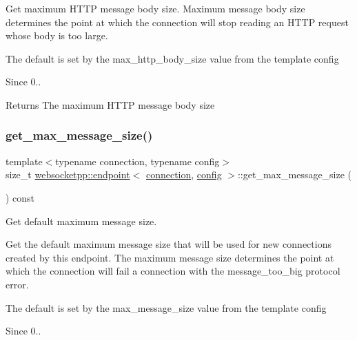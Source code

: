 Get maximum H\+T\+TP message body size. Maximum message body size determines the point at which the connection will stop reading an H\+T\+TP request whose body is too large.

The default is set by the max\+\_\+http\+\_\+body\+\_\+size value from the template config

\begin{DoxySince}{Since}
0..
\end{DoxySince}
\begin{DoxyReturn}{Returns}
The maximum H\+T\+TP message body size 
\end{DoxyReturn}
\mbox{\label{classwebsocketpp_1_1endpoint_a67d0a1ac6e9a332a485f569e71f85882}} 
\subsubsection{\texorpdfstring{get\+\_\+max\+\_\+message\+\_\+size()}{get\_max\_message\_size()}}
{\footnotesize\ttfamily template$<$typename connection, typename config$>$ \\
size\+\_\+t \mbox{\hyperlink{classwebsocketpp_1_1endpoint}{websocketpp\+::endpoint}}$<$ \mbox{\hyperlink{classwebsocketpp_1_1connection}{connection}}, \mbox{\hyperlink{classconfig}{config}} $>$\+::get\+\_\+max\+\_\+message\+\_\+size (\begin{DoxyParamCaption}{ }\end{DoxyParamCaption}) const\hspace{0.3cm}{\ttfamily [inline]}}



Get default maximum message size. 

Get the default maximum message size that will be used for new connections created by this endpoint. The maximum message size determines the point at which the connection will fail a connection with the message\+\_\+too\+\_\+big protocol error.

The default is set by the max\+\_\+message\+\_\+size value from the template config

\begin{DoxySince}{Since}
0.. 
\end{DoxySince}
\mbox{\label{classwebsocketpp_1_1endpoint_a2a106056b019063573120c7a61472834}} 
